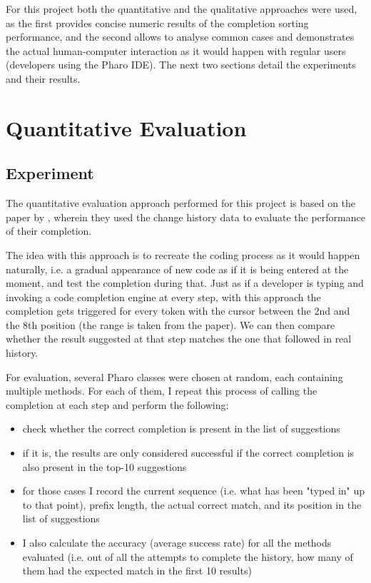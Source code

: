 For this project both the quantitative and the qualitative approaches were used, as the first provides concise numeric results of the completion sorting performance, and the second allows to analyse common cases and demonstrates the actual human-computer interaction as it would happen with regular users (developers using the Pharo IDE). The next two sections detail the experiments and their results.

\section{Quantitative Evaluation}
\label{sec:Evaluation-Quantitative}
\subsection{Experiment}
The quantitative evaluation approach performed for this project is based on the paper by \cite{Robb08a}, wherein they used the change history data to evaluate the performance of their completion.

The idea with this approach is to recreate the coding process as it would happen naturally, i.e. a gradual appearance of new code as if it is being entered at the moment, and test the completion during that. Just as if a developer is typing and invoking a code completion engine at every step, with this approach the completion gets triggered for every token with the cursor between the 2nd and the 8th position (the range is taken from the \cite{Robb08a} paper). We can then compare whether the result suggested at that step matches the one that followed in real history.

For evaluation, several Pharo classes were chosen at random, each containing multiple methods. For each of them, I repeat this process of calling the completion at each step and perform the following:
\begin{itemize}
    \item check whether the correct completion is present in the list of suggestions
    \item if it is, the results are only considered successful if the correct completion is also present in the top-10 suggestions
    \item for those cases I record the current sequence (i.e. what has been "typed in" up to that point), prefix length, the actual correct match, and its position in the list of suggestions
    \item I also calculate the accuracy (average success rate) for all the methods evaluated (i.e. out of all the attempts to complete the history, how many of them had the expected match in the first 10 results)
\end{itemize}

